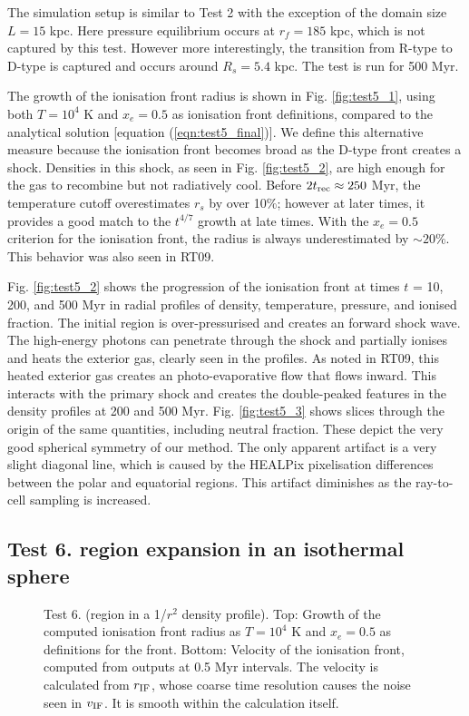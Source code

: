\documentclass[useAMS,usenatbib]{mn2e}
\begin{document}
The simulation setup is similar to Test 2 with the exception of the
domain size $L = 15$ kpc.  Here pressure equilibrium occurs at $r_f =
185$ kpc, which is not captured by this test.  However more
interestingly, the transition from R-type to D-type is captured and
occurs around $R_s = 5.4$ kpc.  The test is run for 500 Myr.

The growth of the ionisation front radius is shown in Fig.
\ref{fig:test5_1}, using both $T = 10^4$ K and $x_e = 0.5$ as
ionisation front definitions, compared to the analytical solution
[equation (\ref{eqn:test5_final})].  We define this alternative
measure because the ionisation front becomes broad as the D-type front
creates a shock.  Densities in this shock, as seen in Fig.
\ref{fig:test5_2}, are high enough for the gas to recombine but not
radiatively cool.  Before $2t_{\rm rec} \approx 250$ Myr, the
temperature cutoff overestimates $r_s$ by over 10\%; however at later
times, it provides a good match to the $t^{4/7}$ growth at late times.
With the $x_e = 0.5$ criterion for the ionisation front, the radius is
always underestimated by $\sim20\%$.  This behavior was also seen in
RT09.

Fig. \ref{fig:test5_2} shows the progression of the ionisation front
at times $t$ = 10, 200, and 500 Myr in radial profiles of density,
temperature, pressure, and ionised fraction.  The initial \hii
region is over-pressurised and creates an forward shock wave.  The
high-energy photons can penetrate through the shock and partially
ionises and heats the exterior gas, clearly seen in the profiles.  As
noted in RT09, this heated exterior gas creates an photo-evaporative
flow that flows inward.  This interacts with the primary shock and
creates the double-peaked features in the density profiles at 200 and
500 Myr.  Fig. \ref{fig:test5_3} shows slices through the origin of
the same quantities, including neutral fraction.  These depict the
very good spherical symmetry of our method.  The only apparent
artifact is a very slight diagonal line, which is caused by the
HEALPix pixelisation differences between the polar and equatorial
regions.  This artifact diminishes as the ray-to-cell sampling is
increased.

\subsection{Test 6. \hii region expansion in an isothermal
  sphere}

\begin{figure}
  \caption{\label{fig:test6_1} Test 6. (\hii region in a 1/$r^2$
    density profile).  Top: Growth of the computed ionisation front
    radius as $T=10^4$ K and $x_e = 0.5$ as definitions for the front.
    Bottom: Velocity of the ionisation front, computed from outputs at
    0.5 Myr intervals.  The velocity is calculated from $r_{\rm IF}$,
    whose coarse time resolution causes the noise seen in $v_{\rm
      IF}$.  It is smooth within the calculation itself.}
\end{figure}
\end{document}
